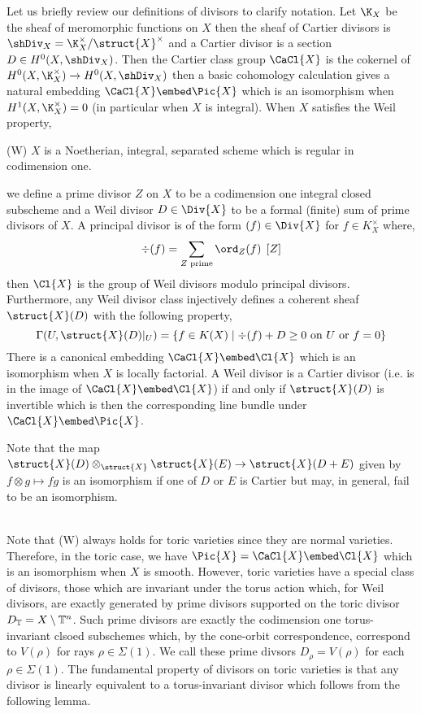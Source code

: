 Let us briefly review our definitions of divisors to clarify notation. Let $\K_X$ be the sheaf of meromorphic functions on $X$ then the sheaf of Cartier divisors is $\shDiv_X = \K_X^\times / \struct{X}^\times$ and a Cartier divisor is a section $D \in H^0(X, \shDiv_X)$. Then the Cartier class group $\CaCl{X}$ is the cokernel of $H^0(X, \K_X^\times) \to H^0(X, \shDiv_X)$ then a basic cohomology calculation gives a natural embedding $\CaCl{X} \embed \Pic{X}$ which is an isomorphism when $H^1(X, \K_X^\times) = 0$ (in particular when $X$ is integral). When $X$ satisfies the Weil property,
\begin{center}
(W) $X$ is a Noetherian, integral, separated scheme which is regular in codimension one. 
\end{center} 
we define a prime divisor $Z$ on $X$ to be a codimension one integral closed subscheme and a Weil divisor $D \in \Div{X}$ to be a formal (finite) sum of prime divisors of $X$. A principal divisor is of the form $(f) \in \Div{X}$ for $f \in K_X^\times$ where,
\[ \div(f) = \sum_{Z \text{ prime}} \ord_{Z}(f) \: \: [Z] \]
then $\Cl{X}$ is the group of Weil divisors modulo principal divisors. Furthermore, any Weil divisor class injectively defines a coherent sheaf $\struct{X}(D)$ with the following property,
\[ \Gamma(U, \struct{X}(D)|_U) = \{ f \in K(X) \mid \div{(f)} + D \ge 0 \text{ on } U \text{ or } f = 0 \} \] 
There is a canonical embedding $\CaCl{X} \embed \Cl{X}$ which is an isomorphism when $X$ is locally factorial. A Weil divisor is a Cartier divisor (i.e. is in the image of $\CaCl{X} \embed \Cl{X}$) if and only if $\struct{X}(D)$ is invertible which is then the corresponding line bundle under $\CaCl{X} \embed \Pic{X}$.
\begin{rmk}
Note that the map $\struct{X}(D) \otimes_{\struct{X}} \struct{X}(E) \to \struct{X}(D + E)$ given by $f \otimes g \mapsto fg$ is an isomorphism if one of $D$ or $E$ is Cartier but may, in general, fail to be an isomorphism. 
\end{rmk}
\noindent\\
Note that (W) always holds for toric varieties since they are normal varieties. Therefore, in the toric case, we have $\Pic{X} = \CaCl{X} \embed \Cl{X}$ which is an isomorphism when $X$ is smooth. However, toric varieties have a special class of divisors, those which are invariant under the torus action which, for Weil divisors, are exactly generated by prime divisors supported on the toric divisor $D_{\mathbb{T}} = X \setminus \mathbb{T}^n$. Such prime divisors are exactly the codimension one torus-invariant clsoed subschemes which, by the cone-orbit correspondence, correspond to $V(\rho)$ for rays $\rho \in \Sigma(1)$. We call these prime divsors $D_\rho = V(\rho)$ for each $\rho \in \Sigma(1)$. The fundamental property of divisors on toric varieties is that any divisor is linearly equivalent to a torus-invariant divisor which follows from the following lemma.

